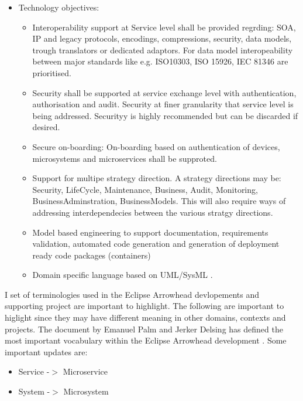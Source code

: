 \documentclass[a4paper]{arrowhead}
\begin{document}
\begin{itemize}
    
  \item Technology objectives: 
   \begin{itemize} 
      
    \item Interoperability support at Service level shall be provided
      regrding: SOA, IP and legacy protocols, encodings, compressions,
      security, data models, trough translators or dedicated
      adaptors. For data model interopeability between major standards
      like e.g. ISO10303, ISO 15926, IEC 81346 are prioritised.
      
    \item Security shall be supported at service exchange level with
      authentication, authorisation and audit. Security at finer
      granularity that service level is being addressed. Securityy is
      highly recommended but can be discarded if desired.  
      
    \item Secure on-boarding: On-boarding based on authentication of
      devices, microsystems and microservices shall be supproted.

    \item Support for multipe strategy direction. A strategy
      directions may be: Security, LifeCycle, Maintenance, Business,
      Audit, Monitoring, BusinessAdminstration, BusinessModels. This
      will also require ways of addressing interdependecies between
      the various stratgy directions.
    \item Model based engineering to support documentation,
      requirements validation, automated code generation and
      generation of deployment ready code packages (containers)
      \cite{Delsing2021a,Delsing2021b}

    \item Domain specific language based on UML/SysML \cite{Arrowhead_DSL}.
   
    \end{itemize}
    
  \end{itemize}
  

I set of terminologies used in the Eclipse Arrowhead devlopements and
supporting project are important to highlight. The following are
important to higlight since they may have different meaning in other
domains, contexts and projects. The document by Emanuel Palm and
Jerker Delsing has defined the most important vocabulary within the
Eclipse Arrowhead development \cite{Palm2023}. Some important updates
are:
\begin{itemize}
\item Service -$>$ Microservice
\item System -$>$ Microsystem

\end{itemize}
\end{document}
